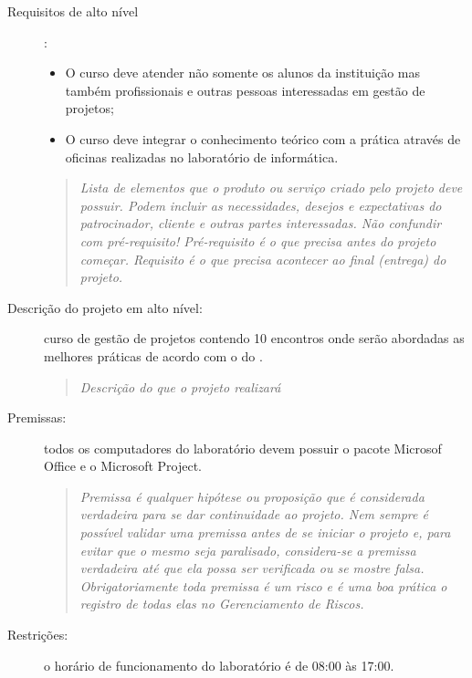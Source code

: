 \begin{description}
	\item[Requisitos de alto nível] : 
	
		\begin{itemize}
			
			\item O curso deve atender não somente os alunos da instituição mas também profissionais e outras pessoas interessadas em gestão de projetos;
			
			\item O curso deve integrar o conhecimento teórico com a prática através de oficinas realizadas no laboratório de informática.
			
		\end{itemize}
		
	\begin{quote}
		\emph{Lista de elementos que o produto ou serviço criado pelo projeto deve possuir. Podem incluir as necessidades, desejos e expectativas do patrocinador, cliente e outras partes interessadas. Não confundir com pré-requisito! Pré-requisito é o que precisa antes do projeto começar. Requisito é o que precisa acontecer ao final (entrega) do projeto.}
	\end{quote}
	

	\item[Descrição do projeto em alto nível:] curso de gestão de projetos contendo 10 encontros onde serão abordadas as melhores práticas de acordo com o \bok do \pmi.

	\begin{quote}
		\emph{Descrição do que o projeto realizará}
	\end{quote}

	\item[Premissas: ] todos os computadores do laboratório devem possuir o pacote Microsof Office e o Microsoft Project.
	
	\begin{quote}
		\emph{Premissa é qualquer hipótese ou proposição que é considerada verdadeira para se dar continuidade ao projeto. Nem sempre é possível validar uma premissa antes de se iniciar o projeto e, para evitar que o mesmo seja paralisado, considera-se a premissa verdadeira até que ela possa ser verificada ou se mostre falsa. Obrigatoriamente toda premissa é um risco e é uma boa prática o registro de todas elas no Gerenciamento de Riscos.}
	\end{quote}

	\item[Restrições: ] o horário de funcionamento do laboratório é de 08:00 às 17:00.
	

\end{description}
